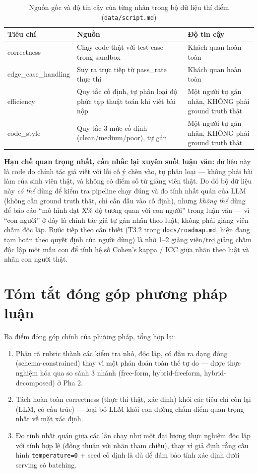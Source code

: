\documentclass[a4paper,12pt]{report}
\begin{document}
\begin{table}[h]
\centering
\begin{tabular}{lll}
\toprule
\textbf{Tiêu chí} & \textbf{Nguồn} & \textbf{Độ tin cậy} \\
\midrule
correctness & Chạy code thật với test case trong sandbox & Khách quan hoàn toàn \\
edge\_case\_handling & Suy ra trực tiếp từ pass\_rate thực thi & Khách quan hoàn toàn \\
efficiency & Quy tắc cố định, tự phân loại độ phức tạp thuật toán
  khi viết bài nộp & Một người tự gán nhãn, KHÔNG phải ground truth thật \\
code\_style & Quy tắc 3 mức cố định (clean/medium/poor), tự gán & Một người tự gán nhãn,
  KHÔNG phải ground truth thật \\
\bottomrule
\end{tabular}
\caption{Nguồn gốc và độ tin cậy của từng nhãn trong bộ dữ liệu thí điểm
(\texttt{data/script.md})}
\end{table}

\textbf{Hạn chế quan trọng nhất, cần nhắc lại xuyên suốt luận văn:} dữ liệu
này là code do chính tác giả viết với lỗi cố ý chèn vào, tự phân loại —
không phải bài làm của sinh viên thật, và không có điểm số từ giảng viên
thật. Do đó bộ dữ liệu này \emph{có thể} dùng để kiểm tra pipeline chạy
đúng và đo tính nhất quán của LLM (không cần ground truth thật, chỉ cần đầu
vào cố định), nhưng \emph{không thể} dùng để báo cáo ``mô hình đạt X\% độ
tương quan với con người'' trong luận văn — vì ``con người'' ở đây là chính
tác giả tự gán nhãn theo luật, không phải giảng viên chấm độc lập. Bước
tiếp theo cần thiết (T3.2 trong \texttt{docs/roadmap.md}, hiện đang tạm
hoãn theo quyết định của người dùng) là nhờ 1--2 giảng viên/trợ giảng chấm
độc lập một mẫu con để tính hệ số Cohen's kappa / ICC giữa nhãn theo luật
và nhãn con người thật.

\section{Tóm tắt đóng góp phương pháp luận}

Ba điểm đóng góp chính của phương pháp, tổng hợp lại:

\begin{enumerate}
  \item Phân rã rubric thành các kiểm tra nhỏ, độc lập, có đầu ra dạng
    đóng (schema-constrained) thay vì một phán đoán toàn thể tự do —
    được thực nghiệm hóa qua so sánh 3 nhánh (free-form, hybrid-freeform,
    hybrid-decomposed) ở Pha 2.
  \item Tách hoàn toàn correctness (thực thi thật, xác định) khỏi các tiêu
    chí còn lại (LLM, có cấu trúc) — loại bỏ LLM khỏi con đường chấm điểm
    quan trọng nhất về mặt xác định.
  \item Đo tính nhất quán giữa các lần chạy như một đại lượng thực nghiệm
    độc lập với tính hợp lệ (đồng thuận với nhãn tham chiếu), thay vì giả
    định rằng cấu hình \texttt{temperature=0} + seed cố định là đủ để đảm
    bảo tính xác định dưới serving có batching.
\end{enumerate}
\end{document}
